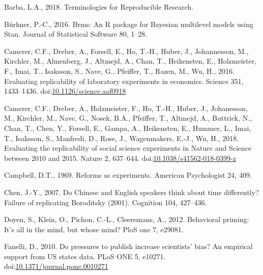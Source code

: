 \documentclass[]{elsarticle} %
\newlength{\cslhangindent}
\newenvironment{CSLReferences}[2] %
 {%
  \setlength{\parindent}{0pt}
  \ifodd #1 \everypar{\setlength{\hangindent}{\cslhangindent}}\ignorespaces\fi
  \ifnum #2 > 0
  \setlength{\parskip}{#2\baselineskip}
  \fi
 }%
 {}
\begin{document}
\hypertarget{refs}{}
\begin{CSLReferences}{1}{0}
\leavevmode{}%
Barba, L.A., 2018. Terminologies for {Reproducible} {Research}.

\leavevmode{}%
Bürkner, P.-C., 2016. Brms: {An} {R} package for {Bayesian} multilevel
models using {Stan}. Journal of Statistical Software 80, 1--28.

\leavevmode{}%
Camerer, C.F., Dreber, A., Forsell, E., Ho, T.-H., Huber, J.,
Johannesson, M., Kirchler, M., Almenberg, J., Altmejd, A., Chan, T.,
Heikensten, E., Holzmeister, F., Imai, T., Isaksson, S., Nave, G.,
Pfeiffer, T., Razen, M., Wu, H., 2016. Evaluating replicability of
laboratory experiments in economics. Science 351, 1433--1436.
doi:\href{https://doi.org/10.1126/science.aaf0918}{10.1126/science.aaf0918}

\leavevmode{}%
Camerer, C.F., Dreber, A., Holzmeister, F., Ho, T.-H., Huber, J.,
Johanesson, M., Kirchler, M., Nave, G., Nosek, B.A., Pfeiffer, T.,
Altmejd, A., Buttrick, N., Chan, T., Chen, Y., Forsell, E., Gampa, A.,
Heikensten, E., Hummer, L., Imai, T., Isaksson, S., Manfredi, D., Rose,
J., Wagenmakers, E.-J., Wu, H., 2018. Evaluating the replicability of
social science experiments in {Nature} and {Science} between 2010 and
2015. Nature 2, 637--644.
doi:\href{https://doi.org/10.1038/s41562-018-0399-z}{10.1038/s41562-018-0399-z}

\leavevmode{}%
Campbell, D.T., 1969. Reforms as experiments. American Psychologist 24,
409.

\leavevmode{}%
Chen, J.-Y., 2007. Do {Chinese} and {English} speakers think about time
differently? {Failure} of replicating {Boroditsky} (2001). Cognition
104, 427--436.

\leavevmode{}%
Doyen, S., Klein, O., Pichon, C.-L., Cleeremans, A., 2012. Behavioral
priming: It's all in the mind, but whose mind? PloS one 7, e29081.

\leavevmode{}%
Fanelli, D., 2010. Do pressures to publish increase scientists' bias? An
empirical support from US states data. PLoS ONE 5, e10271.
doi:\href{https://doi.org/10.1371/journal.pone.0010271}{10.1371/journal.pone.0010271}


\end{CSLReferences}
\end{document}
